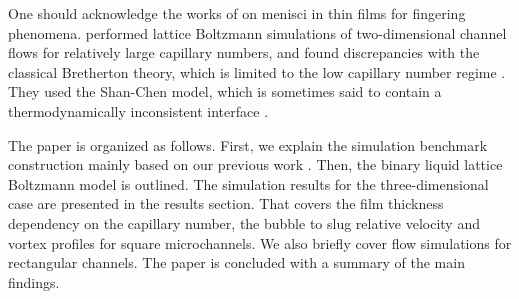 \documentclass[preprint,12pt]{elsarticle}
\begin{document}
One should acknowledge the works of \citet{pagonabarraga-fingers} on menisci
in thin films for fingering phenomena. \citet{sehgal-microchannel} performed lattice Boltzmann
simulations of two-dimensional channel flows for relatively large capillary numbers, and
found discrepancies with the classical Bretherton theory, which
is limited to the low capillary number regime \cite{giavedoni-numerical}. They used the Shan-Chen model,
 which is sometimes said to contain a thermodynamically
inconsistent interface \cite{nourgaliev-breakup}. 

The paper is organized as follows.  First, we explain the simulation benchmark construction
mainly based on our previous work \cite{kuzmin-binary2d}. Then, the binary liquid lattice
Boltzmann model is outlined. The simulation results for the three-dimensional case are presented in
the results section. That covers the film thickness dependency on the capillary number, the bubble
to slug relative velocity and vortex profiles for square microchannels. We also briefly cover flow
simulations for rectangular channels. The paper
is concluded with a summary of the main findings.
\end{document}
